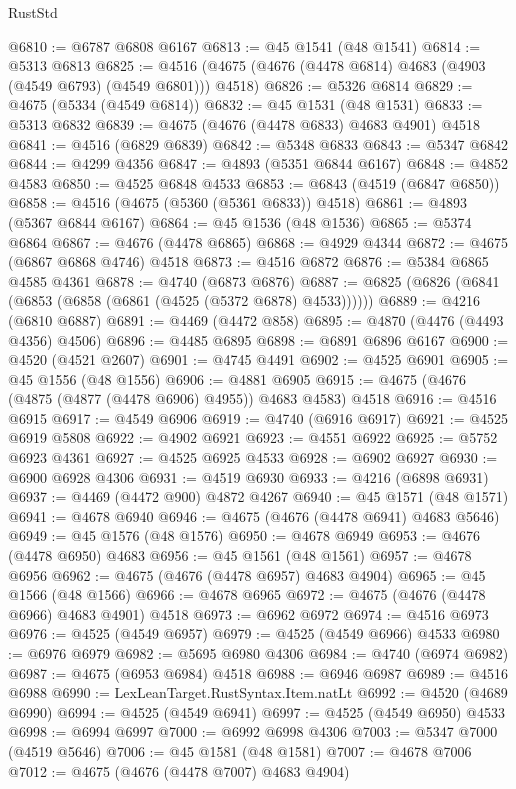 \begin{lexlean}{RustStd}
\begin{coremodule}
@6810 := @6787 @6808 @6167
@6813 := @45 @1541 (@48 @1541)
@6814 := @5313 @6813
@6825 := @4516 (@4675 (@4676 (@4478 @6814) @4683 (@4903 (@4549 @6793) (@4549 @6801))) @4518)
@6826 := @5326 @6814
@6829 := @4675 (@5334 (@4549 @6814))
@6832 := @45 @1531 (@48 @1531)
@6833 := @5313 @6832
@6839 := @4675 (@4676 (@4478 @6833) @4683 @4901) @4518
@6841 := @4516 (@6829 @6839)
@6842 := @5348 @6833
@6843 := @5347 @6842
@6844 := @4299 @4356
@6847 := @4893 (@5351 @6844 @6167)
@6848 := @4852 @4583
@6850 := @4525 @6848 @4533
@6853 := @6843 (@4519 (@6847 @6850))
@6858 := @4516 (@4675 (@5360 (@5361 @6833)) @4518)
@6861 := @4893 (@5367 @6844 @6167)
@6864 := @45 @1536 (@48 @1536)
@6865 := @5374 @6864
@6867 := @4676 (@4478 @6865)
@6868 := @4929 @4344
@6872 := @4675 (@6867 @6868 @4746) @4518
@6873 := @4516 @6872
@6876 := @5384 @6865 @4585 @4361
@6878 := @4740 (@6873 @6876)
@6887 := @6825 (@6826 (@6841 (@6853 (@6858 (@6861 (@4525 (@5372 @6878) @4533))))))
@6889 := @4216 (@6810 @6887)
@6891 := @4469 (@4472 @858)
@6895 := @4870 (@4476 (@4493 @4356) @4506)
@6896 := @4485 @6895
@6898 := @6891 @6896 @6167
@6900 := @4520 (@4521 @2607)
@6901 := @4745 @4491
@6902 := @4525 @6901
@6905 := @45 @1556 (@48 @1556)
@6906 := @4881 @6905
@6915 := @4675 (@4676 (@4875 (@4877 (@4478 @6906) @4955)) @4683 @4583) @4518
@6916 := @4516 @6915
@6917 := @4549 @6906
@6919 := @4740 (@6916 @6917)
@6921 := @4525 @6919 @5808
@6922 := @4902 @6921
@6923 := @4551 @6922
@6925 := @5752 @6923 @4361
@6927 := @4525 @6925 @4533
@6928 := @6902 @6927
@6930 := @6900 @6928 @4306
@6931 := @4519 @6930
@6933 := @4216 (@6898 @6931)
@6937 := @4469 (@4472 @900) @4872 @4267
@6940 := @45 @1571 (@48 @1571)
@6941 := @4678 @6940
@6946 := @4675 (@4676 (@4478 @6941) @4683 @5646)
@6949 := @45 @1576 (@48 @1576)
@6950 := @4678 @6949
@6953 := @4676 (@4478 @6950) @4683
@6956 := @45 @1561 (@48 @1561)
@6957 := @4678 @6956
@6962 := @4675 (@4676 (@4478 @6957) @4683 @4904)
@6965 := @45 @1566 (@48 @1566)
@6966 := @4678 @6965
@6972 := @4675 (@4676 (@4478 @6966) @4683 @4901) @4518
@6973 := @6962 @6972
@6974 := @4516 @6973
@6976 := @4525 (@4549 @6957)
@6979 := @4525 (@4549 @6966) @4533
@6980 := @6976 @6979
@6982 := @5695 @6980 @4306
@6984 := @4740 (@6974 @6982)
@6987 := @4675 (@6953 @6984) @4518
@6988 := @6946 @6987
@6989 := @4516 @6988
@6990 := LexLeanTarget.RustSyntax.Item.natLt
@6992 := @4520 (@4689 @6990)
@6994 := @4525 (@4549 @6941)
@6997 := @4525 (@4549 @6950) @4533
@6998 := @6994 @6997
@7000 := @6992 @6998 @4306
@7003 := @5347 @7000 (@4519 @5646)
@7006 := @45 @1581 (@48 @1581)
@7007 := @4678 @7006
@7012 := @4675 (@4676 (@4478 @7007) @4683 @4904)

\end{coremodule}
\end{lexlean}
